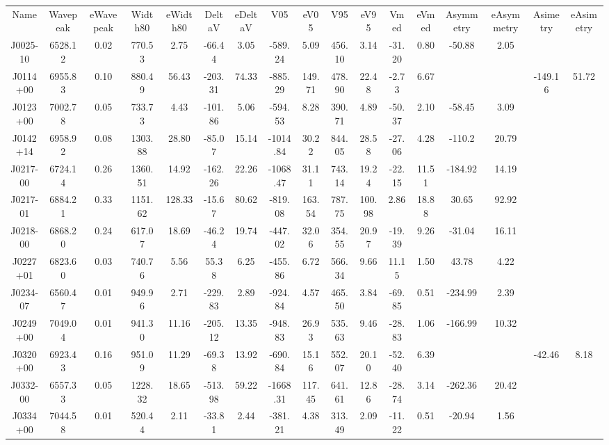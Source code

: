 \begin{table}
\begin{tabular}{ccccccccccccccccc}
Name & Wavepeak & eWavepeak & Width80 & eWidth80 & DeltaV & eDeltaV & V05 & eV05 & V95 & eV95 & Vmed & eVmed & Asymmetry & eAsymmetry & Asimetry & eAsimetry \\
J0025-10 & 6528.12 & 0.02 & 770.53 & 2.75 & -66.44 & 3.05 & -589.24 & 5.09 & 456.10 & 3.14 & -31.20 & 0.80 & -50.88 & 2.05 &  &  \\
J0114+00 & 6955.83 & 0.10 & 880.49 & 56.43 & -203.31 & 74.33 & -885.29 & 149.71 & 478.90 & 22.48 & -2.73 & 6.67 &  &  & -149.16 & 51.72 \\
J0123+00 & 7002.78 & 0.05 & 733.73 & 4.43 & -101.86 & 5.06 & -594.53 & 8.28 & 390.71 & 4.89 & -50.37 & 2.10 & -58.45 & 3.09 &  &  \\
J0142+14 & 6958.92 & 0.08 & 1303.88 & 28.80 & -85.07 & 15.14 & -1014.84 & 30.22 & 844.05 & 28.58 & -27.06 & 4.28 & -110.2 & 20.79 &  &  \\
J0217-00 & 6724.14 & 0.26 & 1360.51 & 14.92 & -162.26 & 22.26 & -1068.47 & 31.11 & 743.14 & 19.24 & -22.15 & 11.51 & -184.92 & 14.19 &  &  \\
J0217-01 & 6884.21 & 0.33 & 1151.62 & 128.33 & -15.67 & 80.62 & -819.08 & 163.54 & 787.75 & 100.98 & 2.86 & 18.88 & 30.65 & 92.92 &  &  \\
J0218-00 & 6868.20 & 0.24 & 617.07 & 18.69 & -46.24 & 19.74 & -447.02 & 32.06 & 354.55 & 20.97 & -19.39 & 9.26 & -31.04 & 16.11 &  &  \\
J0227+01 & 6823.60 & 0.03 & 740.76 & 5.56 & 55.38 & 6.25 & -455.86 & 6.72 & 566.34 & 9.66 & 11.15 & 1.50 & 43.78 & 4.22 &  &  \\
J0234-07 & 6560.47 & 0.01 & 949.96 & 2.71 & -229.83 & 2.89 & -924.84 & 4.57 & 465.50 & 3.84 & -69.85 & 0.51 & -234.99 & 2.39 &  &  \\
J0249+00 & 7049.04 & 0.01 & 941.30 & 11.16 & -205.12 & 13.35 & -948.83 & 26.93 & 535.63 & 9.46 & -28.83 & 1.06 & -166.99 & 10.32 &  &  \\
J0320+00 & 6923.43 & 0.16 & 951.09 & 11.29 & -69.38 & 13.92 & -690.84 & 15.16 & 552.07 & 20.10 & -52.40 & 6.39 &  &  & -42.46 & 8.18 \\
J0332-00 & 6557.33 & 0.05 & 1228.32 & 18.65 & -513.98 & 59.22 & -1668.31 & 117.45 & 641.61 & 12.86 & -28.74 & 3.14 & -262.36 & 20.42 &  &  \\
J0334+00 & 7044.58 & 0.01 & 520.44 & 2.11 & -33.81 & 2.44 & -381.21 & 4.38 & 313.49 & 2.09 & -11.22 & 0.51 & -20.94 & 1.56 &  &  \\

\end{tabular}
\end{table}
